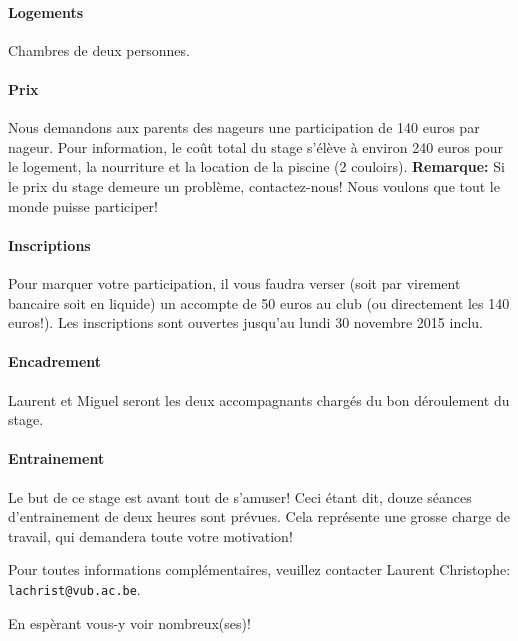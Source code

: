 \documentclass{article}
\begin{document}
\paragraph{Logements} Chambres de deux personnes.

\paragraph{Prix} Nous demandons aux parents des nageurs une participation de 140 euros par nageur. Pour information, le coût total du stage s'élève à environ 240 euros pour le logement, la nourriture et la location de la piscine (2 couloirs). {\bf Remarque:} Si le prix du stage demeure un problème, contactez-nous! Nous voulons que tout le monde puisse participer!

\paragraph{Inscriptions} Pour marquer votre participation, il vous faudra verser (soit par virement bancaire soit en liquide) un accompte de 50 euros au club (ou directement les 140 euros!). Les inscriptions sont ouvertes jusqu'au lundi 30 novembre 2015 inclu.

\paragraph{Encadrement} Laurent et Miguel seront les deux accompagnants chargés du bon déroulement du stage.

\paragraph{Entrainement} Le but de ce stage est avant tout de s'amuser! Ceci étant dit, douze séances d'entrainement de deux heures sont prévues. Cela représente une grosse charge de travail, qui demandera toute votre motivation!

\vspace{1cm}
\hspace{-0.66cm} Pour toutes informations complémentaires, veuillez contacter Laurent Christophe: \texttt{lachrist@vub.ac.be}.
\vspace{0.7cm}

En espèrant vous-y voir nombreux(ses)!
\end{document}
